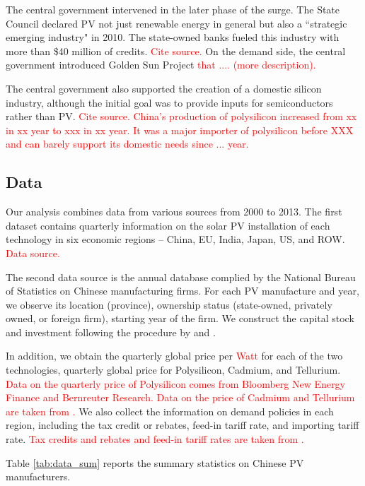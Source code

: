 \documentclass[12pt]{article}
\begin{document}
The central government intervened in the later phase of the surge. The State Council declared PV not just renewable energy in general but also a ``strategic emerging industry" in 2010. The state-owned banks fueled this industry with more than \$40 million of credits. \textcolor{red}{Cite source.} On the demand side, the central government introduced Golden Sun Project \textcolor{red}{that .... (more description).}

The central government also supported the creation of a domestic silicon industry, although the initial goal was to provide inputs for semiconductors rather than PV. \textcolor{red}{Cite source.} \textcolor{red}{China's production of polysilicon increased from xx in xx year to xxx in xx year. It was a major importer of polysilicon before XXX and can barely support its domestic needs since ... year.}

\subsection{Data}
\label{subsec:inst_data}

Our analysis combines data from various sources from 2000 to 2013. The first dataset contains quarterly information on the solar PV installation of each technology in six economic regions -- China, EU, India, Japan, US, and ROW.  \textcolor{red}{Data source.} 

The second data source is the annual database complied by the National Bureau of Statistics on Chinese manufacturing firms. For each PV manufacture and year, we observe its location (province), ownership status (state-owned, privately owned, or foreign firm), starting year of the firm.  We construct the capital stock and investment following the procedure by \citet{brandt2012creative} and \citet{barwick2025industrial}.


In addition, we obtain the quarterly global price per \textcolor{red}{Watt}  for each of the two technologies, quarterly global price for Polysilicon, Cadmium, and Tellurium. \textcolor{red}{Data on the quarterly price of Polysilicon comes from Bloomberg New Energy Finance and Bernreuter Research. Data on the price of Cadmium and Tellurium are taken from .} 
We also collect the information on demand policies in each region, including the tax credit or rebates, feed-in tariff rate, and importing tariff rate. \textcolor{red}{Tax credits and rebates and feed-in tariff rates are taken from .} 

Table \ref{tab:data_sum} reports the summary statistics on Chinese PV manufacturers.
\end{document}
